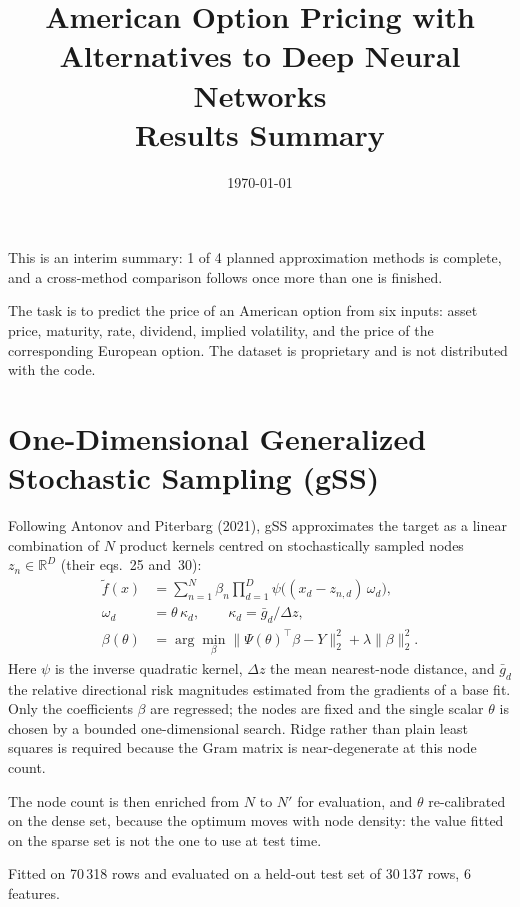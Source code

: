 \documentclass[11pt,a4paper]{article}
\title{American Option Pricing with Alternatives to Deep Neural Networks\\
       \large Results Summary}
\author{}
\date{\today}
\begin{document}
\maketitle

\noindent This is an interim summary: 1 of 4 planned approximation methods is complete, and a cross-method comparison follows once more than one is finished.

The task is to predict the price of an American option from six inputs: asset price, maturity, rate, dividend, implied volatility, and the price of the corresponding European option. The dataset is proprietary and is not distributed with the code.

\section{One-Dimensional Generalized Stochastic Sampling (gSS)}

Following Antonov and Piterbarg (2021), gSS approximates the target as a linear
combination of $N$ product kernels centred on stochastically sampled nodes
$z_n \in \mathbb{R}^D$ (their eqs.~25 and~30):
%
\begin{align}
  \tilde{f}(x) &= \sum_{n=1}^{N} \beta_n
      \prod_{d=1}^{D} \psi\!\big( (x_d - z_{n,d})\,\omega_d \big),
      \label{eq:gss-model} \\[2pt]
  \omega_d &= \theta\,\kappa_d,
      \qquad \kappa_d = \bar{g}_d / \Delta z,
      \label{eq:freq-bounds} \\[2pt]
  \beta(\theta) &= \arg\min_{\beta}
      \big\lVert \Psi(\theta)^{\top}\beta - Y \big\rVert_2^{2}
      + \lambda \lVert \beta \rVert_2^{2}.
      \label{eq:ridge}
\end{align}
%
Here $\psi$ is the inverse quadratic kernel, $\Delta z$ the mean nearest-node
distance, and $\bar{g}_d$ the relative directional risk magnitudes estimated from
the gradients of a base fit. Only the coefficients $\beta$ are regressed; the
nodes are fixed and the single scalar $\theta$ is chosen by a bounded
one-dimensional search. Ridge rather than plain least squares is required because
the Gram matrix is near-degenerate at this node count.

The node count is then enriched from $N$ to $N'$ for evaluation, and $\theta$
re-calibrated on the dense set, because the optimum moves with node density: the
value fitted on the sparse set is not the one to use at test time.

Fitted on 70\,318 rows and evaluated on a held-out test set of 30\,137 rows, 6 features.
\end{document}
